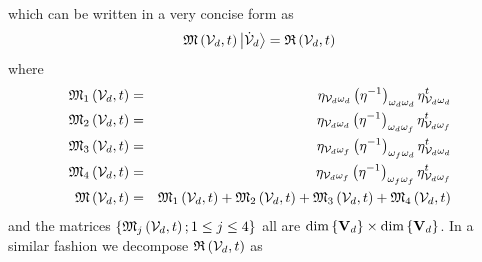 which can be written in a very concise form as 
\begin{equation}
{\frak M}\left( {\cal V}_{d},t\right) \left| {\cal \dot{V}}_{d}\right\rangle
={\frak R}\left( {\cal V}_{d},t\right)
\end{equation}%
where 
\begin{eqnarray}
{\frak M}_{1}\left( {\cal V}_{d},t\right) &=&\eta _{{\cal V}_{d}\omega
_{d}}\left( \eta ^{-1}\right) _{{\cal \omega }_{d}{\cal \omega }_{d}}\eta _{%
{\cal V}_{d}\omega _{d}}^{t}  \nonumber \\
{\frak M}_{2}\left( {\cal V}_{d},t\right) &=&\eta _{{\cal V}_{d}\omega
_{d}}\left( \eta ^{-1}\right) _{{\cal \omega }_{d}{\cal \omega }_{f}}\eta _{%
{\cal V}_{d}\omega _{f}}^{t}  \nonumber \\
{\frak M}_{3}\left( {\cal V}_{d},t\right) &=&\eta _{{\cal V}_{d}\omega
_{f}}\left( \eta ^{-1}\right) _{{\cal \omega }_{f}{\cal \omega }_{d}}\eta _{%
{\cal V}_{d}\omega _{d}}^{t}  \nonumber \\
{\frak M}_{4}\left( {\cal V}_{d},t\right) &=&\eta _{{\cal V}_{d}\omega
_{f}}\left( \eta ^{-1}\right) _{{\cal \omega }_{f}{\cal \omega }_{f}}\eta _{%
{\cal V}_{d}\omega _{f}}^{t}  \nonumber \\
{\frak M}\left( {\cal V}_{d},t\right) &=&{\frak M}_{1}\left( {\cal V}%
_{d},t\right) +{\frak M}_{2}\left( {\cal V}_{d},t\right) +{\frak M}%
_{3}\left( {\cal V}_{d},t\right) +{\frak M}_{4}\left( {\cal V}_{d},t\right)
\end{eqnarray}%
and the matrices $\left\{ {\frak M}_{j}\left( {\cal V}_{d},t\right) ;1\leq
j\leq 4\right\} $ all are $\dim \left\{ {\bf V}_{d}\right\} \times \dim
\left\{ {\bf V}_{d}\right\} $. In a similar fashion we decompose ${\frak R}%
\left( {\cal V}_{d},t\right) $ as 
